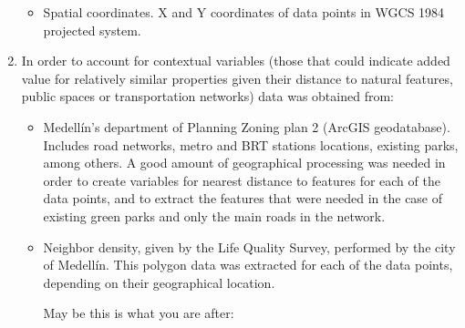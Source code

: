 \documentclass[journal]{IEEEtran}
\begin{document}
\begin{enumerate}
\begin{itemize}
\item Spatial coordinates. X and Y coordinates of data points in WGCS 1984 projected system.

\end{itemize}

\item In order to account for contextual variables (those that could indicate added value for relatively similar properties given their distance to natural features, public spaces or transportation networks) data was obtained from:

\begin{itemize}
\item Medellín’s department of Planning Zoning plan 2 (ArcGIS geodatabase). Includes road networks, metro and BRT stations locations, existing parks, among others. A good amount of geographical processing was needed in order to create variables for nearest distance to features for each of the data points, and to extract
the features that were needed in the case of existing green parks and only the main roads in the network.

\item Neighbor density, given by the Life Quality Survey, performed by the city of Medellín. This polygon data was extracted for each of the data points, depending on their geographical location.




	

May be this is what you are after:


\begin{table}[htb]
\caption{Summary of the newly created variables.}
\label{1234}
\end{table}




\end{itemize}

\end{enumerate}
\end{document}
